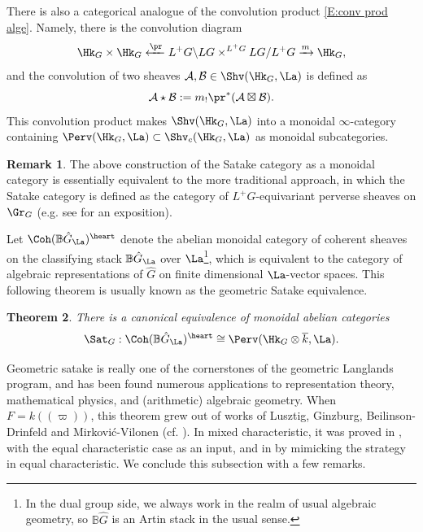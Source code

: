 \documentclass[11pt]{amsart}
\newtheorem{thm}{Theorem}[subsection]
\theoremstyle{definition}
\theoremstyle{definition}
\newtheorem{rmk}[thm]{Remark}
\theoremstyle{definition}
\numberwithin{equation}{section}
\newcommand{\bB}{{\mathbb B}}
\newcommand{\mA}{{\mathcal A}}
\newcommand{\mB}{{\mathcal B}}
\begin{document}
There is also a categorical analogue of the convolution product \eqref{E:conv prod alge}. Namely, there is the convolution diagram
\[
 \Hk_G\times\Hk_G\xleftarrow{\pr}  L^+G\backslash LG\times^{L^+G} LG/L^+G\xrightarrow{m} \Hk_G,
\]
and the convolution of two sheaves $\mA,\mB\in\Shv(\Hk_G,\La)$ is defined as
\begin{equation}\label{E: conv product of sheaves}
\mA\star\mB:= m_!\pr^*(\mA\boxtimes \mB).
\end{equation} 
This convolution product makes $\Shv(\Hk_G,\La)$ into a monoidal $\infty$-category containing $\Perv(\Hk_G,\La)\subset \Shv_{c}(\Hk_G,\La)$ as monoidal subcategories. 

\begin{rmk}
The above construction of the Satake category as a monoidal category is essentially equivalent to the more traditional approach, in which the Satake category is defined as the category of $L^+G$-equivariant perverse sheaves on $\Gr_G$ (e.g. see \cite{Zhu-PCMI} for an exposition). 
\end{rmk}

Let $\Coh(\bB\hat{G}_\La)^{\heart}$ denote the abelian monoidal category of coherent sheaves on the classifying stack $\bB\hat{G}_\La$ over $\La$\footnote{In the dual group side, we always work in the realm of usual algebraic geometry, so $\bB\hat{G}$ is an Artin stack in the usual sense.}, which is equivalent to the category of
algebraic representations of $\hat{G}$ on finite dimensional $\La$-vector spaces. This following theorem is usually known as the geometric Satake equivalence.
\begin{thm}\label{intro:geomSat}
There is a canonical equivalence of monoidal abelian categories
\[
\Sat_G:  \Coh(\bB\hat{G}_\La)^{\heart}\cong \Perv(\Hk_G\otimes \overline k,\La).
\]
\end{thm}
Geometric satake is really one of the cornerstones of the geometric Langlands program, and has been found numerous applications to representation theory, mathematical physics, and (arithmetic) algebraic geometry.
When $F=k(\!(\varpi)\!)$, this theorem grew out of works of Lusztig, Ginzburg, Beilinson-Drinfeld and Mirkovi\'{c}-Vilonen (cf. \cite{Lusztig-q-analog, Beilinson-Drinfeld-Hitchin, Mirkovic-Vilonen-GeoSat}). In mixed characteristic, it was proved in \cite{Zhu-Satake-Mixed, Yu-Integral-Satake}, with the equal characteristic case as an input, and in \cite{Fargues-Scholze-Geometrization} by mimicking the strategy in equal characteristic. 
We conclude this subsection with a few remarks.
\end{document}
